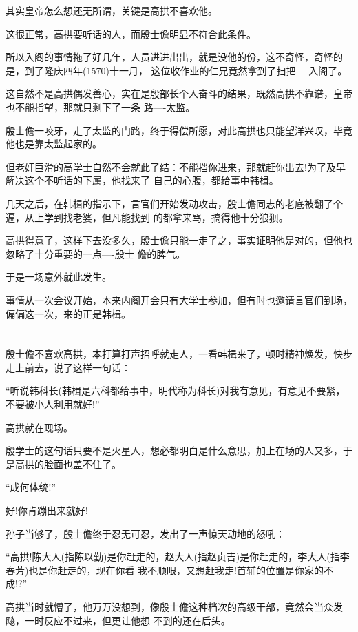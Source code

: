 \documentclass[11pt,a4paper,onecolumn]{article}
\begin{document}
其实皇帝怎么想还无所谓，关键是高拱不喜欢他。

这很正常，高拱要听话的人，而殷士儋明显不符合此条件。

所以入阁的事情拖了好几年，人员进进出出，就是没他的份，这不奇怪，奇怪的是，到了隆庆四年(1570)十一月，
这位收作业的仁兄竟然拿到了扫把----入阁了。

这自然不是高拱偶发善心，实在是殷部长个人奋斗的结果，既然高拱不靠谱，皇帝也不能指望，那就只剩下了一条
路----太监。

殷士儋一咬牙，走了太监的门路，终于得偿所愿，对此高拱也只能望洋兴叹，毕竟他也是靠太监起家的。

但老奸巨滑的高学士自然不会就此了结：不能挡你进来，那就赶你出去!为了及早解决这个不听话的下属，他找来了
自己的心腹，都给事中韩楫。

几天之后，在韩楫的指示下，言官们开始发动攻击，殷士儋同志的老底被翻了个遍，从上学到找老婆，但凡能找到
的都拿来骂，搞得他十分狼狈。

高拱得意了，这样下去没多久，殷士儋只能一走了之，事实证明他是对的，但他也忽略了十分重要的一点----殷士
儋的脾气。

于是一场意外就此发生。

事情从一次会议开始，本来内阁开会只有大学士参加，但有时也邀请言官们到场，偏偏这一次，来的正是韩楫。

\section[\thesection]{}

殷士儋不喜欢高拱，本打算打声招呼就走人，一看韩楫来了，顿时精神焕发，快步走上前去，说了这样一句话：

``听说韩科长(韩楫是六科都给事中，明代称为科长)对我有意见，有意见不要紧，不要被小人利用就好!''

高拱就在现场。

殷学士的这句话只要不是火星人，想必都明白是什么意思，加上在场的人又多，于是高拱的脸面也盖不住了。

``成何体统!''

好!你肯蹦出来就好!

孙子当够了，殷士儋终于忍无可忍，发出了一声惊天动地的怒吼：

``高拱!陈大人(指陈以勤)是你赶走的，赵大人(指赵贞吉)是你赶走的，李大人(指李春芳)也是你赶走的，现在你看
我不顺眼，又想赶我走!首辅的位置是你家的不成!?''

高拱当时就懵了，他万万没想到，像殷士儋这种档次的高级干部，竟然会当众发飚，一时反应不过来，但更让他想
不到的还在后头。
\end{document}
